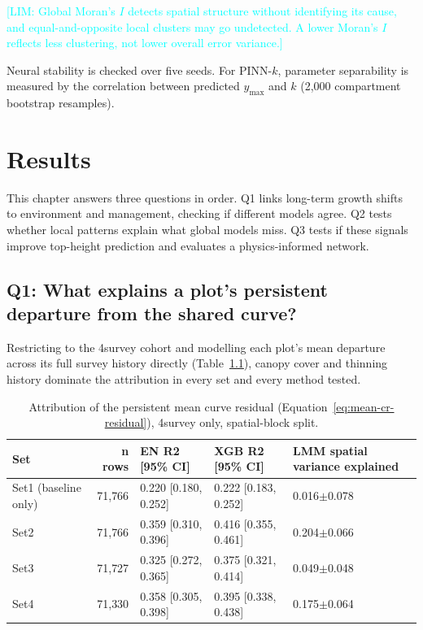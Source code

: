 \documentclass[logo,msc,ai]{infthesis}           %
\newcommand{\limit}[1]{\textcolor{cyan}{[LIM: #1]}}
\begin{document}
\limit{Global Moran's $I$ detects spatial structure without identifying its cause, and equal-and-opposite local clusters may go undetected. A lower Moran's $I$ reflects less clustering, not lower overall error variance.}

Neural stability is checked over five seeds. For PINN-$k$, parameter separability is measured by the correlation between predicted $y_{\max}$ and $k$ (2,000 compartment bootstrap resamples).









\chapter{Results} \label{ch:results}
This chapter answers three questions in order. Q1 links long-term growth shifts to environment and management, checking if different models agree. Q2 tests whether local patterns explain what global models miss. Q3 tests if these signals improve top-height prediction and evaluates a physics-informed network.

\section{Q1: What explains a plot's persistent departure from the shared curve?}

Restricting to the 4survey cohort and modelling each plot's mean departure across its
full survey history directly (Table~\ref{tab:results-q1}), canopy cover and thinning
history dominate the attribution in every set and every method tested.

\begin{table}[!htbp]
\centering
\scriptsize
\renewcommand{\arraystretch}{1.2}
\begin{tabular}{lrlll}
\toprule
Set & n rows & EN R2 [95\% CI] & XGB R2 [95\% CI] & LMM spatial variance explained \\
\midrule
Set1 (baseline only) & 71{,}766 & 0.220 [0.180, 0.252] & 0.222 [0.183, 0.252] & 0.016$\pm$0.078 \\
Set2 & 71{,}766 & 0.359 [0.310, 0.396] & 0.416 [0.355, 0.461] & 0.204$\pm$0.066 \\
Set3 & 71{,}727 & 0.325 [0.272, 0.365] & 0.375 [0.321, 0.414] & 0.049$\pm$0.048 \\
Set4 & 71{,}330 & 0.358 [0.305, 0.398] & 0.395 [0.338, 0.438] & 0.175$\pm$0.064 \\
\bottomrule
\end{tabular}
\caption{\small{Attribution of the persistent mean curve residual (Equation~\ref{eq:mean-cr-residual}),
4survey only, spatial-block split.}}
\label{tab:results-q1}
\end{table}
\end{document}
